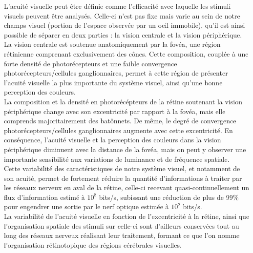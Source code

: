 L'acuité visuelle peut être définie comme l'efficacité  avec laquelle les stimuli visuels peuvent être analysés. Celle-ci n'est pas fixe mais varie au sein de notre champs visuel (portion de l'espace observée par un oeil immobile), qu'il est ainsi possible de séparer en deux parties : la vision centrale et la vision périphérique.\autocite{Werner2014} \\
La vision centrale est soutenue anatomiquement par la fovéa, une région rétinienne comprenant exclusivement des cônes. Cette composition, couplée à une forte densité de photorécepteurs et une faible convergence photorécepteurs/cellules ganglionnaires, permet à cette région de présenter l'acuité visuelle la plus importante du système visuel, ainsi qu'une bonne perception des couleurs. \autocite{Werner2014} \\
La composition et la densité en photorécépteurs de la rétine soutenant la vision périphérique change avec son excentricité par rapport à la fovéa, mais elle comprends majoritairement des batônnets. 
De même, le degré de convergence photorécepteurs/cellules ganglionnaires augmente avec cette excentricité.
En conséquence, l'acuité visuelle et la perception des couleurs dans la vision périphérique diminuent avec la distance de la fovéa, mais on peut y observer une importante sensibilité aux variations de luminance et de fréquence spatiale. \autocite{Werner2014} \\
Cette variabilité des caractéristiques de notre système visuel, et notamment de son acuité, permet de fortement réduire la quantité d'informations à traiter par les réseaux nerveux en aval de la rétine, celle-ci recevant quasi-continuellement un flux d'information estimé à $10^{8}$ bits/s, subissant une réduction de plus de 99\% pour engendrer une sortie par le nerf optique estimée à $10^{2}$ bits/s. \autocite{Kortum1996, Werner2014, Zhaoping2014} \\
La variabilité de l'acuité visuelle en fonction de l'excentricité à la rétine, ainsi que l'organisation spatiale des stimuli sur celle-ci sont d'ailleurs conservées tout au long des réseaux nerveux réalisant leur traitement, formant ce que l'on nomme l'organisation rétinotopique des régions cérébrales visuelles. \autocite{Werner2014} \\

